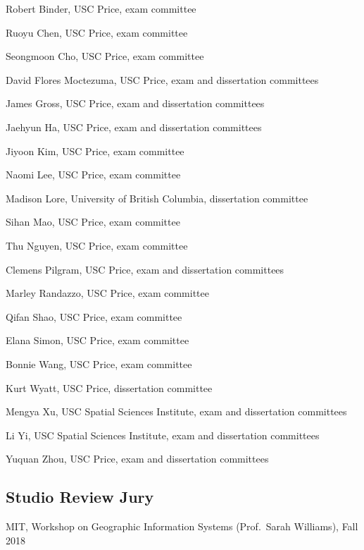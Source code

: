 \documentclass[11pt,letterpaper]{report} %
\newcommand{\listitemspace}{0.25em}
\renewenvironment{itemize}
{\begin{list}{}{\setlength{\leftmargin}{0em}
                \setlength{\parskip}{0em}
                \setlength{\itemsep}{\listitemspace}
                \setlength{\parsep}{\listitemspace}}}
{\end{list}}
\begin{document}
    \begin{itemize}

        \item Robert Binder, USC Price, exam committee
        \item Ruoyu Chen, USC Price, exam committee
        \item Seongmoon Cho, USC Price, exam committee
        \item David Flores Moctezuma, USC Price, exam and dissertation committees
        \item James Gross, USC Price, exam and dissertation committees
        \item Jaehyun Ha, USC Price, exam and dissertation committees
        \item Jiyoon Kim, USC Price, exam committee
        \item Naomi Lee, USC Price, exam committee
        \item Madison Lore, University of British Columbia, dissertation committee
        \item Sihan Mao, USC Price, exam committee
        \item Thu Nguyen, USC Price, exam committee
        \item Clemens Pilgram, USC Price, exam and dissertation committees
        \item Marley Randazzo, USC Price, exam committee
        \item Qifan Shao, USC Price, exam committee
        \item Elana Simon, USC Price, exam committee
        \item Bonnie Wang, USC Price, exam committee
        \item Kurt Wyatt, USC Price, dissertation committee
        \item Mengya Xu, USC Spatial Sciences Institute, exam and dissertation committees
        \item Li Yi, USC Spatial Sciences Institute, exam and dissertation committees
        \item Yuquan Zhou, USC Price, exam and dissertation committees

    \end{itemize}

    \subsection*{Studio Review Jury}

    \begin{itemize}

    \item MIT, Workshop on Geographic Information Systems (Prof.\ Sarah Williams), Fall 2018

    \end{itemize}
\end{document}
